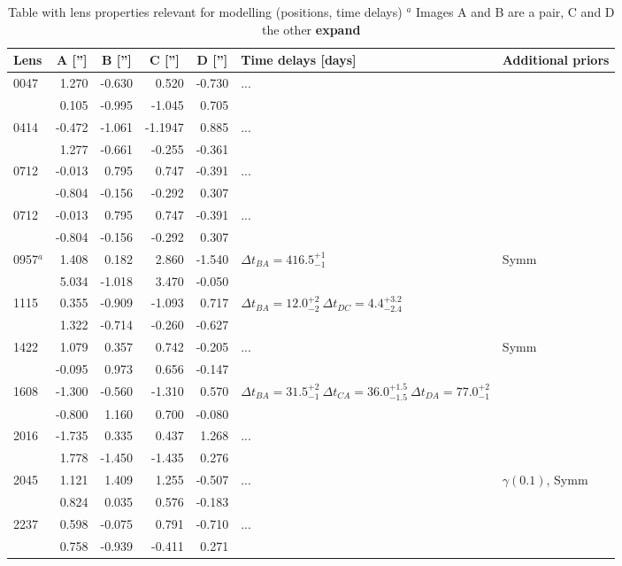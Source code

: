\documentclass[useAMS,usenatbib]{mn2e}
\begin{document}
\begin{table}
  \begin{center}
    \begin{tabular}{l r r r r l l}
      Lens    & \multicolumn{1}{c}{A ['']} & \multicolumn{1}{c}{B ['']} & \multicolumn{1}{c}{C ['']} & \multicolumn{1}{c}{D ['']} & Time delays [days] & Additional priors \\ \hline
      0047 & 1.270 & -0.630 & 0.520 & -0.730 & ... & \\
           & 0.105 & -0.995 & -1.045 & 0.705 & &  \\
      0414 & -0.472 & -1.061 & -1.1947 & 0.885 & ... & \\
           & 1.277 & -0.661 & -0.255 & -0.361 & &  \\
      0712 & -0.013 & 0.795 & 0.747 & -0.391 & ... & \\
           & -0.804 & -0.156 & -0.292 & 0.307 & &  \\
      0712 & -0.013 & 0.795 & 0.747 & -0.391 & ... & \\
           & -0.804 & -0.156 & -0.292 & 0.307 &  &  \\
      0957$^{a}$ & 1.408 & 0.182 & 2.860 & -1.540 & $\Delta t_{BA}=416.5^{+1}_{-1}$ & Symm \\
           & 5.034 & -1.018 & 3.470 & -0.050 &  &  \\
      1115 & 0.355 & -0.909 & -1.093 & 0.717 & $\Delta t_{BA}=12.0^{+2}_{-2} \ \Delta t_{DC}=4.4^{+3.2}_{-2.4}$ & \\
           & 1.322 & -0.714 & -0.260 & -0.627 & &  \\
      1422 & 1.079 & 0.357 & 0.742 & -0.205 & ... & Symm \\
           & -0.095 & 0.973 & 0.656 & -0.147 &  &  \\
      1608 & -1.300 & -0.560 & -1.310 & 0.570 & $\Delta t_{BA}=31.5^{+2}_{-1} \ \Delta t_{CA}=36.0^{+1.5}_{-1.5} \ \Delta t_{DA}=77.0^{+2}_{-1}$ & \\
           & -0.800 & 1.160 & 0.700 & -0.080 &  &  \\
      2016 & -1.735 & 0.335 & 0.437 & 1.268 & ... & \\
           & 1.778 & -1.450 & -1.435 & 0.276 &  &  \\
      2045 & 1.121 & 1.409 & 1.255 & -0.507 & ... & $\gamma(0.1)$, Symm \\
           & 0.824 & 0.035 & 0.576 & -0.183 &  &  \\
      2237 & 0.598 & -0.075 & 0.791 & -0.710 & ... & \\
              & 0.758 & -0.939 & -0.411 & 0.271 &  &  \\
    \end{tabular}
    \caption[width=\linewidth]{Table with lens properties relevant for modelling (positions, time delays) \newline $^{a}$ Images A and B are a pair, C and D the other \textbf{expand}}
    \label{tab:lensmodelling}
  \end{center}
\end{table}
\end{document}
